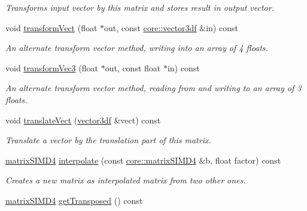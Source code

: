 \begin{DoxyCompactItemize}
\begin{DoxyCompactList}\small\item\em Transforms input vector by this matrix and stores result in output vector. \end{DoxyCompactList}\item 
void \hyperlink{classirr_1_1core_1_1matrixSIMD4_a8da1fb612b9558320f228f4af0845598}{transform\+Vect} (float $\ast$out, const \hyperlink{namespaceirr_1_1core_a06f169d08b5c429f5575acb7edbad811}{core\+::vector3df} \&in) const \hypertarget{classirr_1_1core_1_1matrixSIMD4_a8da1fb612b9558320f228f4af0845598}{}\label{classirr_1_1core_1_1matrixSIMD4_a8da1fb612b9558320f228f4af0845598}

\begin{DoxyCompactList}\small\item\em An alternate transform vector method, writing into an array of 4 floats. \end{DoxyCompactList}\item 
void \hyperlink{classirr_1_1core_1_1matrixSIMD4_ade5d046f8d30bfa400db6df91eddd40f}{transform\+Vec3} (float $\ast$out, const float $\ast$in) const \hypertarget{classirr_1_1core_1_1matrixSIMD4_ade5d046f8d30bfa400db6df91eddd40f}{}\label{classirr_1_1core_1_1matrixSIMD4_ade5d046f8d30bfa400db6df91eddd40f}

\begin{DoxyCompactList}\small\item\em An alternate transform vector method, reading from and writing to an array of 3 floats. \end{DoxyCompactList}\item 
void \hyperlink{classirr_1_1core_1_1matrixSIMD4_a49c12f0a75c6ec9dce03f4b7df68ca1a}{translate\+Vect} (\hyperlink{namespaceirr_1_1core_a06f169d08b5c429f5575acb7edbad811}{vector3df} \&vect) const \hypertarget{classirr_1_1core_1_1matrixSIMD4_a49c12f0a75c6ec9dce03f4b7df68ca1a}{}\label{classirr_1_1core_1_1matrixSIMD4_a49c12f0a75c6ec9dce03f4b7df68ca1a}

\begin{DoxyCompactList}\small\item\em Translate a vector by the translation part of this matrix. \end{DoxyCompactList}\item 
\hyperlink{classirr_1_1core_1_1matrixSIMD4}{matrix\+S\+I\+M\+D4} \hyperlink{classirr_1_1core_1_1matrixSIMD4_a300bd77f8b402b15f2e5044ed00e03d8}{interpolate} (const \hyperlink{classirr_1_1core_1_1matrixSIMD4}{core\+::matrix\+S\+I\+M\+D4} \&b, float factor) const 
\begin{DoxyCompactList}\small\item\em Creates a new matrix as interpolated matrix from two other ones. \end{DoxyCompactList}\item 
\hyperlink{classirr_1_1core_1_1matrixSIMD4}{matrix\+S\+I\+M\+D4} \hyperlink{classirr_1_1core_1_1matrixSIMD4_a54230a8b2187a48c556306519de481d9}{get\+Transposed} () const \hypertarget{classirr_1_1core_1_1matrixSIMD4_a54230a8b2187a48c556306519de481d9}{}\label{classirr_1_1core_1_1matrixSIMD4_a54230a8b2187a48c556306519de481d9}


\end{DoxyCompactItemize}
